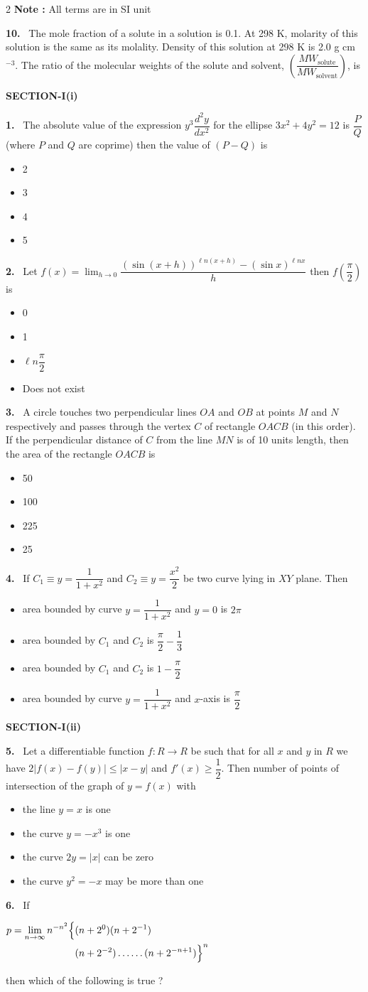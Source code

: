 \documentclass[10pt]{extarticle}
\newcommand{\partsec}[2]{\par\medskip\noindent{\large\bfseries PART-#1: #2}\par\smallskip}
\newcommand{\sect}[1]{\par\smallskip\noindent\textbf{#1}\par}
\newcommand{\qn}[1]{\par\smallskip\noindent\textbf{#1.}~}
\newenvironment{qoptions}{\begin{itemize}[leftmargin=1.8em,itemsep=1pt,topsep=2pt,label={}]}{\end{itemize}}
\newcommand{\opt}[2]{\item[(#1)] #2}
\begin{document}
\begin{multicols}{2}
\textbf{Note :} All terms are in SI unit
\qn{10} The mole fraction of a solute in a solution is 0.1. At 298 K, molarity of this solution is the same as its molality. Density of this solution at 298 K is 2.0 g cm$^{-3}$. The ratio of the molecular weights of the solute and solvent, $\left(\dfrac{MW_{\text{solute}}}{MW_{\text{solvent}}}\right)$, is
\partsec{3}{MATHEMATICS}
\sect{SECTION-I(i)}
\qn{1} The absolute value of the expression $y^3\dfrac{d^2y}{dx^2}$ for the ellipse $3x^2+4y^2=12$ is $\dfrac PQ$ (where $P$ and $Q$ are coprime) then the value of $(P-Q)$ is
\begin{qoptions}
\opt{A}{2}
\opt{B}{3}
\opt{C}{4}
\opt{D}{5}
\end{qoptions}
\qn{2} Let $f(x)=\displaystyle\lim_{h\to0}\dfrac{(\sin(x+h))^{\ell n(x+h)}-(\sin x)^{\ell nx}}h$ then $f\left(\dfrac\pi2\right)$ is
\begin{qoptions}
\opt{A}{0}
\opt{B}{1}
\opt{C}{$\ell n\dfrac\pi2$}
\opt{D}{Does not exist}
\end{qoptions}
\qn{3} A circle touches two perpendicular lines $OA$ and $OB$ at points $M$ and $N$ respectively and passes through the vertex $C$ of rectangle $OACB$ (in this order). If the perpendicular distance of $C$ from the line $MN$ is of 10 units length, then the area of the rectangle $OACB$ is
\begin{qoptions}
\opt{A}{50}
\opt{B}{100}
\opt{C}{225}
\opt{D}{25}
\end{qoptions}
\qn{4} If $C_1\equiv y=\dfrac1{1+x^2}$ and $C_2\equiv y=\dfrac{x^2}2$ be two curve lying in $XY$ plane. Then
\begin{qoptions}
\opt{A}{area bounded by curve $y=\dfrac1{1+x^2}$ and $y=0$ is $2\pi$}
\opt{B}{area bounded by $C_1$ and $C_2$ is $\dfrac\pi2-\dfrac13$}
\opt{C}{area bounded by $C_1$ and $C_2$ is $1-\dfrac\pi2$}
\opt{D}{area bounded by curve $y=\dfrac1{1+x^2}$ and $x$-axis is $\dfrac\pi2$}
\end{qoptions}
\sect{SECTION-I(ii)}
\qn{5} Let a differentiable function $f:R\to R$ be such that for all $x$ and $y$ in $R$ we have $2|f(x)-f(y)|\leq|x-y|$ and $f'(x)\geqslant\dfrac12$. Then number of points of intersection of the graph of $y=f(x)$ with
\begin{qoptions}
\opt{A}{the line $y=x$ is one}
\opt{B}{the curve $y=-x^3$ is one}
\opt{C}{the curve $2y=|x|$ can be zero}
\opt{D}{the curve $y^2=-x$ may be more than one}
\end{qoptions}
\qn{6} If \par\noindent\hfill$\displaystyle\begin{aligned}p=\lim_{n\to\infty}n^{-n^2}\Bigl\{&(n+2^0)(n+2^{-1})\\&(n+2^{-2})\dots\dots(n+2^{-n+1})\Bigr\}^n\end{aligned}$\hfill\null\par\noindent then which of the following is true ?

\end{multicols}
\end{document}

